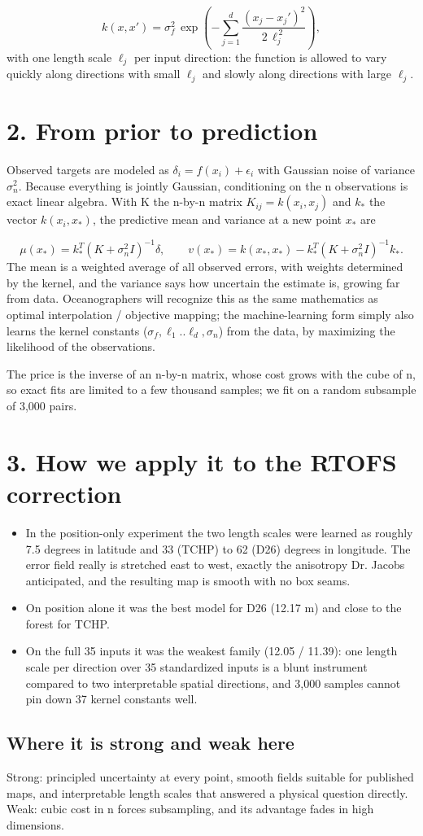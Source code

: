 \documentclass[11pt]{article}
\begin{document}
\[ k(x,x') = \sigma_f^2\, \exp\left(-\sum_{j=1}^{d} \frac{(x_j-x_j')^2}{2\,\ell_j^{\,2}}\right), \]
with one length scale $\ell_j$ per input direction: the function is allowed to vary quickly along directions with small $\ell_j$ and slowly along directions with large $\ell_j$.

\section*{2. From prior to prediction}
Observed targets are modeled as $\delta_i = f(x_i) + \epsilon_i$ with Gaussian noise of variance $\sigma_n^2$. Because everything is jointly Gaussian, conditioning on the n observations is exact linear algebra. With K the n-by-n matrix $K_{ij}=k(x_i,x_j)$ and $k_*$ the vector $k(x_i, x_*)$, the predictive mean and variance at a new point $x_*$ are

\[ \mu(x_*) = k_*^{T} (K+\sigma_n^2 I)^{-1} \delta, \qquad v(x_*) = k(x_*,x_*) - k_*^{T}(K+\sigma_n^2 I)^{-1} k_* . \]
The mean is a weighted average of all observed errors, with weights determined by the kernel, and the variance says how uncertain the estimate is, growing far from data. Oceanographers will recognize this as the same mathematics as optimal interpolation / objective mapping; the machine-learning form simply also learns the kernel constants ($\sigma_f, \ell_1..\ell_d, \sigma_n$) from the data, by maximizing the likelihood of the observations.

The price is the inverse of an n-by-n matrix, whose cost grows with the cube of n, so exact fits are limited to a few thousand samples; we fit on a random subsample of 3,000 pairs.

\section*{3. How we apply it to the RTOFS correction}
\begin{itemize}
\item In the position-only experiment the two length scales were learned as roughly 7.5 degrees in latitude and 33 (TCHP) to 62 (D26) degrees in longitude. The error field really is stretched east to west, exactly the anisotropy Dr. Jacobs anticipated, and the resulting map is smooth with no box seams.
\item On position alone it was the best model for D26 (12.17 m) and close to the forest for TCHP.
\item On the full 35 inputs it was the weakest family (12.05 / 11.39): one length scale per direction over 35 standardized inputs is a blunt instrument compared to two interpretable spatial directions, and 3,000 samples cannot pin down 37 kernel constants well.
\end{itemize}
\subsection*{Where it is strong and weak here}
Strong: principled uncertainty at every point, smooth fields suitable for published maps, and interpretable length scales that answered a physical question directly. Weak: cubic cost in n forces subsampling, and its advantage fades in high dimensions.
\end{document}
